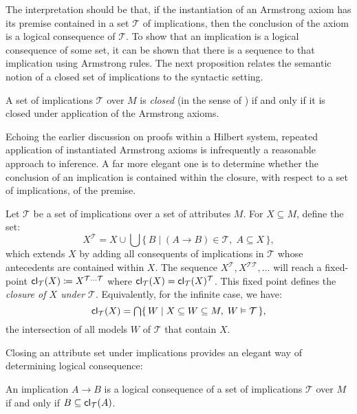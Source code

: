 The interpretation should be that, if the instantiation of an Armstrong axiom has its premise contained in a set $\mathcal{T}$
of implications, then the conclusion of the axiom is a logical consequence of $\mathcal{T}$. To show that an implication
is a logical consequence of some set, it can be shown that there is a sequence to that implication using Armstrong rules.
The next proposition relates the semantic notion of a closed set of implications to the syntactic setting.

\begin{proposition}
	\label{proposition:armstrong-closed}

	A set of implications $\mathcal{T}$ over $M$ is \emph{closed} (in the sense of )
	if and only if it is closed under application of the Armstrong axioms.
\end{proposition}

Echoing the earlier discussion on proofs within a Hilbert system, repeated application of instantiated Armstrong axioms is
infrequently a reasonable approach to inference. A far more elegant one is to determine whether the conclusion of an
implication is contained within the closure, with respect to a set of implications, of the premise.

\begin{definition}
	\label{definition:closure-operator-implications} Let $\mathcal{T}$ be a set of implications over a set of attributes $M$.
	For $X \subseteq M$, define the set:
	\[
		X^{\mathcal{T}}= X \cup \bigcup \{\, B \mid (A \rightarrow B) \in \mathcal{T}, \; A \subseteq X \,\},
	\]
	which extends $X$ by adding all consequents of implications in $\mathcal{T}$ whose antecedents are contained within
	$X$. The sequence $X^{\mathcal{T}}, X^{\mathcal{T} \mathcal{T}}, \ldots$ will reach a fixed-point $\mathsf{cl}_{\mathcal{T}}({X})\coloneqq
	X^{\mathcal{T} \ldots \mathcal{T}}$ where $\mathsf{cl}_{\mathcal{T}}({X})= \mathsf{cl}_{\mathcal{T}}({X})^{\mathcal{T}}$. This fixed point
	defines the \emph{closure of $X$ under $\mathcal{T}$}. Equivalently, for the infinite case, we have:
	\[
		\cl{\mathcal{T}}{X}= \bigcap \{\, W \mid X \subseteq W \subseteq M, \; W \vDash \mathcal{T}\,\},
	\]
	the intersection of all models $W$ of $\mathcal{T}$ that contain $X$.
\end{definition}

Closing an attribute set under implications provides an elegant way of determining logical consequence:

\begin{proposition}
	\label{proposition:} An implication $A \rightarrow B$ is a logical consequence of a set of implications $\mathcal{T}$ over
	$M$ if and only if $B \subseteq \mathsf{cl}_{\mathcal{T}}({A})$.
\end{proposition}

